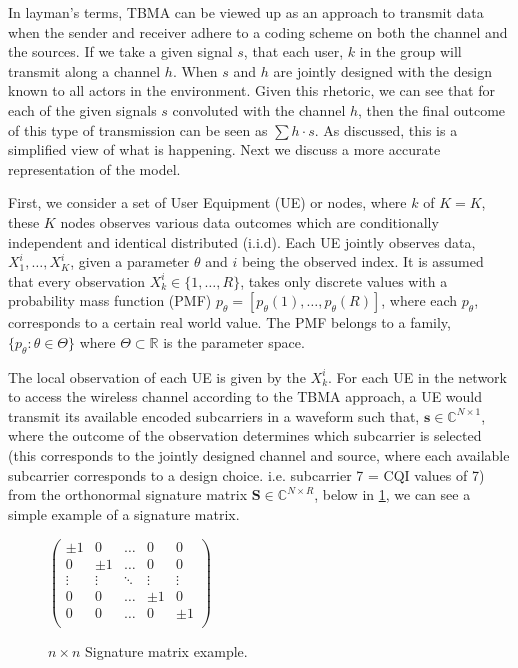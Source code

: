\documentclass{article}
\begin{document}
In layman's terms, TBMA can be viewed up as an approach to transmit data when the sender and receiver adhere to a coding scheme on both the channel and the sources. If we take a given signal $s$, that each user, $k$ in the group will transmit along a channel $h$. When $s$ and $h$ are jointly designed with the design known to all actors in the environment. Given this rhetoric, we can see that for each of the given signals $s$ convoluted with the channel $h$, then the final outcome of this type of transmission can be seen as $\sum h \cdot s$. As discussed, this is a simplified view of what is happening. Next we discuss a more accurate representation of the model. 


First, we  consider a set of User Equipment (UE) or nodes, where ${k}$ of ${K} = K$, these $K$ nodes observes various data outcomes which are conditionally independent and identical distributed (i.i.d). Each UE jointly observes data, $X^i_1, \ldots, X^i_K$, given a parameter $\theta$ and $i$ being the observed index. It is assumed that every observation  ${X^i_k \in \{1, \ldots, R\}}$, takes only discrete values with a probability mass function (PMF) ${p_{\theta} = [p_{\theta}(1), \ldots, p_{\theta}(R)]}$, where each $p_{\theta}$, corresponds to a certain real world value. The PMF belongs to a family, $\{p_{\theta}: \theta \in \Theta\}$ where $\Theta \subset \mathbb{R}$ is the parameter space.



The local observation of each UE is given by the $X^i_k$. For each UE in the network to access the wireless channel according to the TBMA approach, a UE would transmit its available encoded subcarriers in a waveform such that, $\boldsymbol{s} \in \mathbb{C}^{N \times 1}$, where the outcome of the observation determines which subcarrier is selected (this corresponds to the jointly designed channel and source, where each available subcarrier corresponds to a design choice. i.e. subcarrier 7 =  CQI values of 7) from the orthonormal signature matrix $\boldsymbol{S} \in \mathbb{C}^{N \times R}$, below in \cref{fig:sig_mat}, we can see a simple example of a signature matrix.

\begin{figure}[ht]
\centering
    $\begin{pmatrix}
\pm1 & 0 & \hdots & 0 & 0\\
0 & \pm1 & \hdots & 0 & 0 \\
\vdots & \vdots & \ddots & \vdots & \vdots \\
0 & 0 & \hdots & \pm1 & 0 \\
0 & 0 & \hdots & 0 & \pm1 \\
\end{pmatrix}$
\caption{$n \times n$ Signature matrix example.}
\label{fig:sig_mat}
\end{figure}
\end{document}
